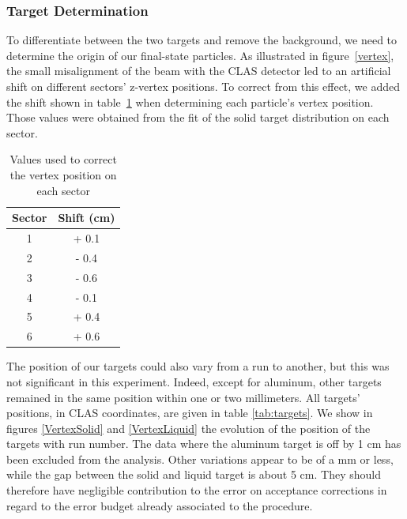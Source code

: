 \subsubsection{Target Determination}

To differentiate between the two targets and remove the background, we need to 
determine the origin of our final-state particles. As illustrated in figure~\ref{vertex}, the small misalignment of the beam with the CLAS detector led to an artificial shift on different sectors' z-vertex positions. To correct from this effect, we added the shift shown in table~\ref{tab:vertex} when determining each particle's vertex position. Those values were obtained from the fit of the solid target distribution on each sector.

\begin{table}[p]
  \centering
  \begin{tabular}{@{} cc @{}}
    \hline
    Sector & Shift (cm) \\ 
    \hline
    1 & + 0.1 \\ 
    2 & - 0.4 \\ 
    3 & - 0.6 \\ 
    4 & - 0.1 \\ 
    5 & + 0.4 \\ 
    6 & + 0.6 \\ 
    \hline
  \end{tabular}
  \caption{Values used to correct the vertex position on each sector}
  \label{tab:vertex}
\end{table}

The position of our targets could also vary from a run to another, but this was not significant in this experiment. Indeed, except for aluminum, other targets remained in the same position within one or two millimeters. All targets' positions, in CLAS coordinates, are given in table \ref{tab:targets}. 
We show in figures \ref{VertexSolid} and \ref{VertexLiquid} the evolution 
of the position of the targets with run number. The data where the aluminum
target is off by 1 cm has been excluded from the analysis. Other variations
appear to be of a mm or less, while the gap between the solid and liquid target
is about 5 cm. They should therefore have negligible contribution to the 
error on acceptance corrections in regard to the error budget already associated
to the procedure.

